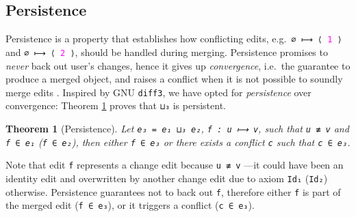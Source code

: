 \documentclass{sigplanconf}
\theoremstyle{plain}
\newtheorem{thm}{Theorem}
\begin{document}
\subsection{Persistence}
Persistence is a property that establishes how conflicting edits,
e.g.\ \texttt{∅ ⟼ ⟨ \textcolor{magenta}{1} ⟩} and \texttt{∅ ⟼ ⟨
  \textcolor{magenta}{2} ⟩}, should be handled during merging.
%
Persistence promises to \emph{never} back out user's changes, hence it
gives up \emph{convergence}, i.e.\ the guarantee to produce a merged
object, and raises a conflict when it is not possible to soundly merge
edits \cite{Pierce07}.
%
Inspired by GNU \texttt{diff3}, we have opted for \emph{persistence}
over convergence: Theorem \ref{thm:persistence} proves that
\texttt{⊔₃} is persistent.



				
\begin{thm}[Persistence]
\label{thm:persistence}
Let \texttt{e₃ = e₁ ⊔₃ e₂}, \texttt{f : u ⟼ v}, such that \texttt{u ≢
  v} and \texttt{f ∈ e₁} (\texttt{f ∈ e₂}), then either \texttt{f ∈
  e₃} or there exists a conflict \texttt{c} such that \texttt{c ∈ e₃}.
\end{thm}
Note that edit \texttt{f} represents a change edit because \texttt{u ≢
  v} ---it could have been an identity edit and overwritten by another
change edit due to axiom \texttt{Id₁} (\texttt{Id₂}) otherwise.
%
Persistence guarantees not to back out \texttt{f}, therefore either
\texttt{f} is part of the merged edit (\texttt{f ∈ e₃}), or it
triggers a conflict (\texttt{c ∈ e₃}).
%
\end{document}
